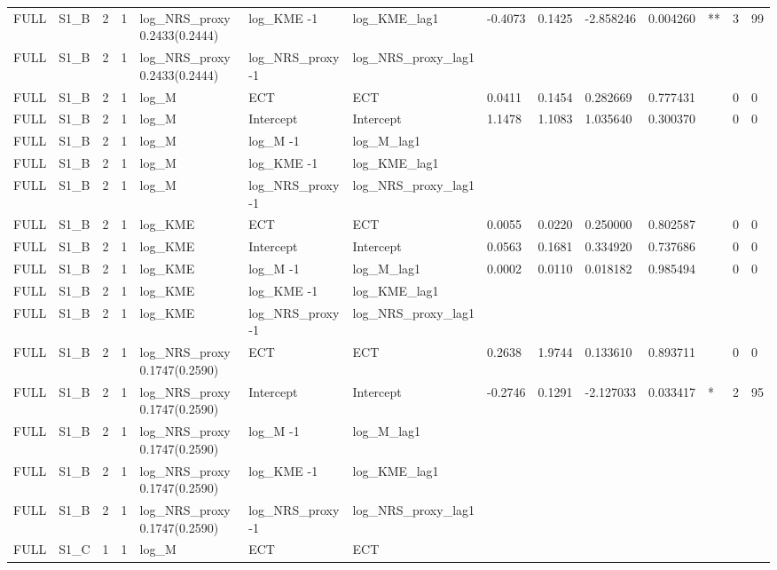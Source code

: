 \begin{tabular}{llllllllllllll}
FULL & S1\_B & 2 & 1 & log\_NRS\_proxy 0.2433(0.2444) & log\_KME -1 & log\_KME\_lag1 & -0.4073 & 0.1425 & -2.858246 & 0.004260 & ** & 3 & 99 \\
FULL & S1\_B & 2 & 1 & log\_NRS\_proxy 0.2433(0.2444) & log\_NRS\_proxy -1 & log\_NRS\_proxy\_lag1 &  &  &  &  &  &  &  \\
FULL & S1\_B & 2 & 1 & log\_M & ECT & ECT & 0.0411 & 0.1454 & 0.282669 & 0.777431 &  & 0 & 0 \\
FULL & S1\_B & 2 & 1 & log\_M & Intercept & Intercept & 1.1478 & 1.1083 & 1.035640 & 0.300370 &  & 0 & 0 \\
FULL & S1\_B & 2 & 1 & log\_M & log\_M -1 & log\_M\_lag1 &  &  &  &  &  &  &  \\
FULL & S1\_B & 2 & 1 & log\_M & log\_KME -1 & log\_KME\_lag1 &  &  &  &  &  &  &  \\
FULL & S1\_B & 2 & 1 & log\_M & log\_NRS\_proxy -1 & log\_NRS\_proxy\_lag1 &  &  &  &  &  &  &  \\
FULL & S1\_B & 2 & 1 & log\_KME & ECT & ECT & 0.0055 & 0.0220 & 0.250000 & 0.802587 &  & 0 & 0 \\
FULL & S1\_B & 2 & 1 & log\_KME & Intercept & Intercept & 0.0563 & 0.1681 & 0.334920 & 0.737686 &  & 0 & 0 \\
FULL & S1\_B & 2 & 1 & log\_KME & log\_M -1 & log\_M\_lag1 & 0.0002 & 0.0110 & 0.018182 & 0.985494 &  & 0 & 0 \\
FULL & S1\_B & 2 & 1 & log\_KME & log\_KME -1 & log\_KME\_lag1 &  &  &  &  &  &  &  \\
FULL & S1\_B & 2 & 1 & log\_KME & log\_NRS\_proxy -1 & log\_NRS\_proxy\_lag1 &  &  &  &  &  &  &  \\
FULL & S1\_B & 2 & 1 & log\_NRS\_proxy 0.1747(0.2590) & ECT & ECT & 0.2638 & 1.9744 & 0.133610 & 0.893711 &  & 0 & 0 \\
FULL & S1\_B & 2 & 1 & log\_NRS\_proxy 0.1747(0.2590) & Intercept & Intercept & -0.2746 & 0.1291 & -2.127033 & 0.033417 & * & 2 & 95 \\
FULL & S1\_B & 2 & 1 & log\_NRS\_proxy 0.1747(0.2590) & log\_M -1 & log\_M\_lag1 &  &  &  &  &  &  &  \\
FULL & S1\_B & 2 & 1 & log\_NRS\_proxy 0.1747(0.2590) & log\_KME -1 & log\_KME\_lag1 &  &  &  &  &  &  &  \\
FULL & S1\_B & 2 & 1 & log\_NRS\_proxy 0.1747(0.2590) & log\_NRS\_proxy -1 & log\_NRS\_proxy\_lag1 &  &  &  &  &  &  &  \\
FULL & S1\_C & 1 & 1 & log\_M & ECT & ECT &  &  &  &  &  &  &  \\

\end{tabular}
